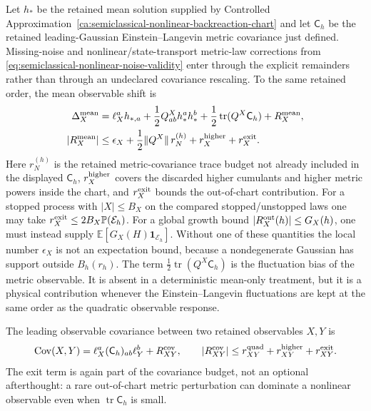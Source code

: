 \begin{controlledapproximation}
Let \(h_*\) be the retained mean solution supplied by
Controlled Approximation~\ref{ca:semiclassical-nonlinear-backreaction-chart}
and let \(\mathsf C_h\) be the retained leading-Gaussian Einstein--Langevin
metric covariance just defined.  Missing-noise and nonlinear/state-transport
metric-law corrections from \eqref{eq:semiclassical-nonlinear-noise-validity}
enter through the explicit remainders rather than through an undeclared
covariance rescaling.  To the same retained order, the mean observable shift is
\begin{equation}
\begin{aligned}
  \Delta_X^{\rm mean}
  &=
  \ell_X^a h_{*,a}
  +
  \frac12 Q^X_{ab}h_*^a h_*^b
  +
  \frac12\operatorname{tr}(Q^X\mathsf C_h)
  +
  R_X^{\rm mean},
  \\
  |R_X^{\rm mean}|
  &\le
  \epsilon_X
  +
  \frac12\lVert Q^X\rVert\,r_N^{(h)}
  +
  r_X^{\rm higher}
  +
  r_X^{\rm exit}.
\end{aligned}
  \label{eq:semiclassical-observable-mean-shift}
\end{equation}
Here \(r_N^{(h)}\) is the retained metric-covariance trace budget not already
included in the displayed \(\mathsf C_h\), \(r_X^{\rm higher}\) covers the
discarded higher cumulants and higher metric powers inside the chart, and
\(r_X^{\rm exit}\) bounds the out-of-chart contribution.  For a stopped
process with \(|X|\le B_X\) on the compared stopped/unstopped laws one may take
\(r_X^{\rm exit}\le 2B_X\mathbb P(\mathcal E_h)\).  For a global growth bound
\(|R_X^{\rm out}(h)|\le G_X(h)\), one must instead supply
\(\mathbb E[G_X(H)\mathbf1_{\mathcal E_h}]\).  Without one of these
quantities the local number \(\epsilon_X\) is not an expectation bound,
because a nondegenerate Gaussian has support outside \(B_h(r_h)\).  The term
\(\frac12\operatorname{tr}(Q^X\mathsf C_h)\) is the fluctuation bias of the
metric observable.  It is absent in a deterministic mean-only treatment, but
it is a physical contribution whenever the Einstein--Langevin fluctuations
are kept at the same order as the quadratic observable response.

The leading observable covariance between two retained observables \(X,Y\) is
\begin{equation}
  \operatorname{Cov}(X,Y)
  =
  \ell_X^a(\mathsf C_h)_{ab}\ell_Y^b
  +
  R_{XY}^{\rm cov},
  \qquad
  |R_{XY}^{\rm cov}|
  \le r_{XY}^{\rm quad}+r_{XY}^{\rm higher}+r_{XY}^{\rm exit}.
  \label{eq:semiclassical-observable-covariance}
\end{equation}
The exit term is again part of the covariance budget, not an optional
afterthought: a rare out-of-chart metric perturbation can dominate a nonlinear
observable even when \(\operatorname{tr}\mathsf C_h\) is small.


\end{controlledapproximation}
